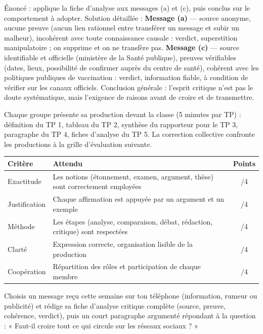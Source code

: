 \documentclass[11pt]{article}
\newcounter{popsec}
\newcounter{popsub}
\newcommand{\courssub}[1]{%
  \stepcounter{popsub}%
  \par\vspace{9pt}\noindent{\popxbold\fontsize{11.5}{13}\selectfont\color{popink}{\color{poporange}\thepopsec.\thepopsub}\hspace{6pt}#1}\par\nopagebreak\vspace{4pt}
}
\begin{document}
\begin{exoresolu}
Énoncé : applique la fiche d'analyse aux messages (a) et (c), puis conclus sur le comportement à adopter.
\tcblower
Solution détaillée : \textbf{Message (a)} — source anonyme, aucune preuve (aucun lien rationnel entre transférer un message et subir un malheur), incohérent avec toute connaissance causale : verdict, superstition manipulatoire ; on supprime et on ne transfère pas. \textbf{Message (c)} — source identifiable et officielle (ministère de la Santé publique), preuves vérifiables (dates, lieux, possibilité de confirmer auprès du centre de santé), cohérent avec les politiques publiques de vaccination : verdict, information fiable, à condition de vérifier sur les canaux officiels. Conclusion générale : l'esprit critique n'est pas le doute systématique, mais l'exigence de raisons avant de croire et de transmettre.
\end{exoresolu}

\courssub{Restitution et évaluation}

Chaque groupe présente sa production devant la classe (5 minutes par TP) : définition du TP 1, tableau du TP 2, synthèse du rapporteur pour le TP 3, paragraphe du TP 4, fiches d'analyse du TP 5. La correction collective confronte les productions à la grille d'évaluation suivante.

\begin{center}
\begin{tabularx}{\linewidth}{|l|X|c|}
\hline
\rowcolor{popblueL} \textbf{Critère} & \textbf{Attendu} & \textbf{Points} \\
\hline
Exactitude & Les notions (étonnement, examen, argument, thèse) sont correctement employées & /4 \\
\hline
Justification & Chaque affirmation est appuyée par un argument et un exemple & /4 \\
\hline
Méthode & Les étapes (analyse, comparaison, débat, rédaction, critique) sont respectées & /4 \\
\hline
Clarté & Expression correcte, organisation lisible de la production & /4 \\
\hline
Coopération & Répartition des rôles et participation de chaque membre & /4 \\
\hline
\end{tabularx}
\end{center}

\begin{exercice}
Choisis un message reçu cette semaine sur ton téléphone (information, rumeur ou publicité) et rédige sa fiche d'analyse critique complète (source, preuve, cohérence, verdict), puis un court paragraphe argumenté répondant à la question : « Faut-il croire tout ce qui circule sur les réseaux sociaux ? »
\end{exercice}
\end{document}
